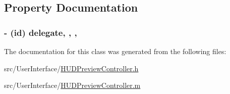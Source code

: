 \subsection{Property Documentation}
\hypertarget{interface_h_u_d_preview_controller_a8d9332fcd23523b1e2520b8765577423}{
\subsubsection[{delegate}]{\setlength{\rightskip}{0pt plus 5cm}-\/ (id) delegate\hspace{0.3cm}{\ttfamily [read]}, {\ttfamily [write]}, {\ttfamily [atomic]}, {\ttfamily [assign]}}}\label{interface_h_u_d_preview_controller_a8d9332fcd23523b1e2520b8765577423}


The documentation for this class was generated from the following files\-:\begin{DoxyCompactItemize}
\item 
src/\-User\-Interface/\hyperlink{_h_u_d_preview_controller_8h}{H\-U\-D\-Preview\-Controller.\-h}\item 
src/\-User\-Interface/\hyperlink{_h_u_d_preview_controller_8m}{H\-U\-D\-Preview\-Controller.\-m}\end{DoxyCompactItemize}
